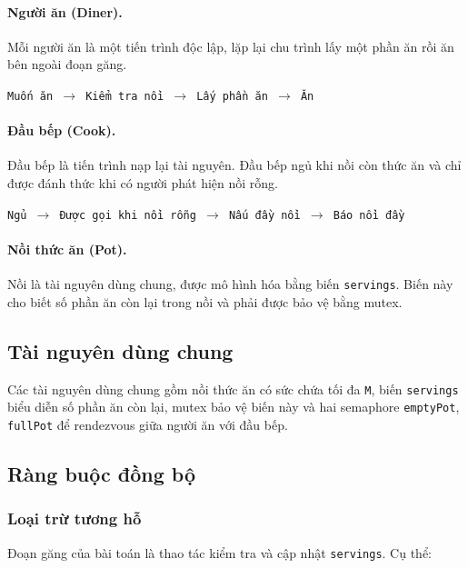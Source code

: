 \paragraph{Người ăn (Diner).}
Mỗi người ăn là một tiến trình độc lập, lặp lại chu trình lấy một phần ăn rồi
ăn bên ngoài đoạn găng.

\begin{center}
\texttt{Muốn ăn $\rightarrow$ Kiểm tra nồi $\rightarrow$ Lấy phần ăn
$\rightarrow$ Ăn}
\end{center}

\paragraph{Đầu bếp (Cook).}
Đầu bếp là tiến trình nạp lại tài nguyên. Đầu bếp ngủ khi nồi còn thức ăn và
chỉ được đánh thức khi có người phát hiện nồi rỗng.

\begin{center}
\texttt{Ngủ $\rightarrow$ Được gọi khi nồi rỗng $\rightarrow$ Nấu đầy nồi
$\rightarrow$ Báo nồi đầy}
\end{center}

\paragraph{Nồi thức ăn (Pot).}
Nồi là tài nguyên dùng chung, được mô hình hóa bằng biến
\texttt{servings}. Biến này cho biết số phần ăn còn lại trong nồi và phải được
bảo vệ bằng mutex.

\subsection{Tài nguyên dùng chung}

Các tài nguyên dùng chung gồm nồi thức ăn có sức chứa tối đa \texttt{M}, biến
\texttt{servings} biểu diễn số phần ăn còn lại, mutex bảo vệ biến này và hai
semaphore \texttt{emptyPot}, \texttt{fullPot} để rendezvous giữa người ăn với
đầu bếp.

\subsection{Ràng buộc đồng bộ}

\subsubsection*{Loại trừ tương hỗ}

Đoạn găng của bài toán là thao tác kiểm tra và cập nhật
\texttt{servings}. Cụ thể:

